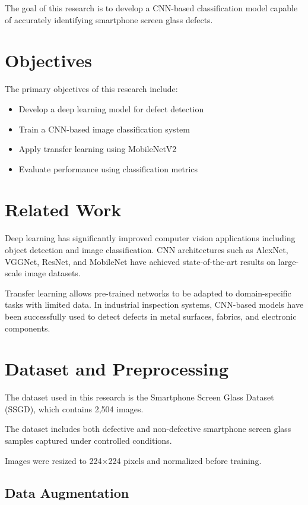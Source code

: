 \documentclass[conference]{IEEEtran}
\begin{document}
The goal of this research is to develop a CNN-based classification model capable of accurately identifying smartphone screen glass defects.

\section{Objectives}

The primary objectives of this research include:

\begin{itemize}
\item Develop a deep learning model for defect detection
\item Train a CNN-based image classification system
\item Apply transfer learning using MobileNetV2
\item Evaluate performance using classification metrics
\end{itemize}

\section{Related Work}

Deep learning has significantly improved computer vision applications including object detection and image classification. CNN architectures such as AlexNet, VGGNet, ResNet, and MobileNet have achieved state-of-the-art results on large-scale image datasets.

Transfer learning allows pre-trained networks to be adapted to domain-specific tasks with limited data. In industrial inspection systems, CNN-based models have been successfully used to detect defects in metal surfaces, fabrics, and electronic components.

\section{Dataset and Preprocessing}

The dataset used in this research is the Smartphone Screen Glass Dataset (SSGD), which contains 2,504 images.

The dataset includes both defective and non-defective smartphone screen glass samples captured under controlled conditions.

Images were resized to 224×224 pixels and normalized before training.

\subsection{Data Augmentation}
\end{document}
